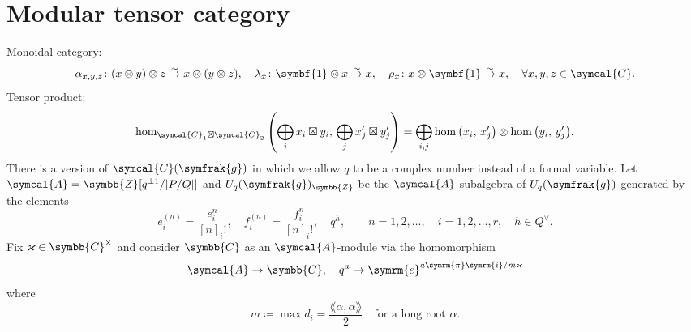 \documentclass{article}
\def\ee{\symrm{e}}
\def\ii{\symrm{i}}
\def\pp{\symrm{\pi}}
\begin{document}
\section{Modular tensor category}

\def\cat#1{\symcal{#1}}

Monoidal category:
\begin{equation}
  \alpha_{x,y,z} \colon (x\otimes y)\otimes z \overset\sim\to x\otimes(y\otimes z), \quad
  \lambda_x \colon \symbf{1}\otimes x \overset\sim\to x, \quad
  \rho_x \colon x\otimes\symbf{1} \overset\sim\to x, \quad \forall x,y,z \in \cat{C}.
\end{equation}
Tensor product:
\begin{equation}
    \hom_{\cat{C}_1\boxtimes\cat{C}_2}
    \qty(\bigoplus_i x_i\boxtimes y_i, \, \bigoplus_j x'_j\boxtimes y'_j)
  = \bigoplus_{i,j} \hom\qty(x_i, \, x_j') \otimes \hom\qty(y_i, \, y_j').
\end{equation}
There is a version of $\cat{C}(\symfrak{g})$ in which we allow $q$ to be a complex number
instead of a formal variable. Let $\symcal{A}=\symbb{Z}[q^{\pm1}/|P/Q|]$ and
$U_q(\symfrak{g})_{\symbb{Z}}$ be the $\symcal{A}$-subalgebra of $U_q(\symfrak{g})$ generated by
the elements
\[
  e_i^{(n)} = \frac{e_i^n}{[n]_i!}, \quad f_i^{(n)} = \frac{f_i^n}{[n]_i!}, \quad q^h, \qquad
  n = 1,2,\ldots, \quad i = 1,2,\ldots,r, \quad h \in Q^\vee.
\]
Fix $\varkappa\in\symbb{C}^\times$ and consider $\symbb{C}$ as an $\symcal{A}$-module via the
homomorphism
\[ \symcal{A} \to \symbb{C}, \quad q^a \mapsto \ee^{a\pp\ii/m\varkappa} \]
where
\begin{equation}
  m \coloneq \max d_i = \frac{\lAngle\alpha,\alpha\rAngle}{2} \quad \text{for a long root $\alpha$}.
\end{equation}
\end{document}
